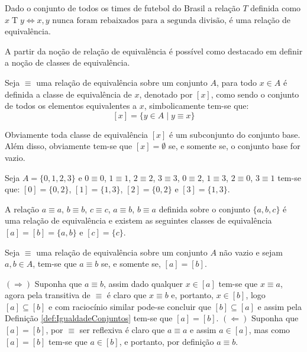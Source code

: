 \begin{exemplo}
	Dado o conjunto de todos os times de futebol do Brasil a relação $T$ definida como $x \mathrel{T} y \Longleftrightarrow x, y \text{ nunca foram rebaixados para a segunda divisão}$, é uma relação de equivalência.
\end{exemplo}

A partir da noção de relação de equivalência é possível como destacado em \cite{abe1991-TC} definir a noção de classes de equivalência.

\begin{definicao}\label{def:ClasseEquivalencia}
	Seja $\equiv$ uma relação de equivalência sobre um conjunto $A$, para todo $x \in A$ é definida a classe de equivalência de $x$, denotado por $[x]$, como sendo o conjunto de todos os elementos equivalentes a $x$, simbolicamente tem-se que:
	$$[x] = \{y \in A \mid y \equiv x\}$$
\end{definicao}

Obviamente toda classe de equivalência $[x]$ é um subconjunto do conjunto base. Além disso,  obviamente tem-se que $[x] = \emptyset$ se, e somente se, o conjunto base for vazio.

\begin{exemplo}\label{exe:ClasseEquivalencia1}
	Seja $A = \{0, 1, 2, 3\}$ e $0 \equiv 0$, $1 \equiv 1$, $2 \equiv 2$, $3 \equiv 3$, $0 \equiv 2$, $1 \equiv 3$, $2 \equiv 0$, $3 \equiv 1$ tem-se que: $[0] = \{0, 2\}$, $[1] = \{1, 3\}$, $[2] = \{0, 2\}$ e $[3] = \{1, 3\}$.
\end{exemplo}

\begin{exemplo}
	A relação $a \equiv a$, $b \equiv b$, $c \equiv c$, $a \equiv b$, $b \equiv a$ definida sobre o conjunto $\{a, b, c\}$ é uma relação de equivalência e existem as seguintes classes de equivalência $[a] = [b] = \{a, b\}$ e $[c] =\{c\}$.
\end{exemplo}

\begin{teorema}\label{teo:EquivalenciaPropriedade1}
	Seja $\equiv$ uma relação de equivalência sobre um conjunto $A$ não vazio e sejam $a, b \in A$, tem-se que $a \equiv b$ se, e somente se, $[a] = [b]$.
\end{teorema}

\begin{prova}
	$(\Rightarrow)$ Suponha que $a \equiv b$, assim dado  qualquer $x \in [a]$ tem-se que $x \equiv a$, agora pela transitiva de $\equiv$ é claro que $x \equiv b$ e, portanto, $x \in [b]$, logo $[a] \subseteq [b]$ e com raciocínio similar pode-se concluir que $[b] \subseteq [a]$ e assim pela Definição \ref{def:IgualdadeConjuntos} tem-se que $[a] = [b]$. $(\Leftarrow)$ Suponha que $[a] = [b]$, por $\equiv$ ser reflexiva é claro que $a \equiv a$ e assim $a \in [a]$, mas como $[a] = [b]$ tem-se que $a \in [b]$, e portanto, por definição $a \equiv b$.
\end{prova}

